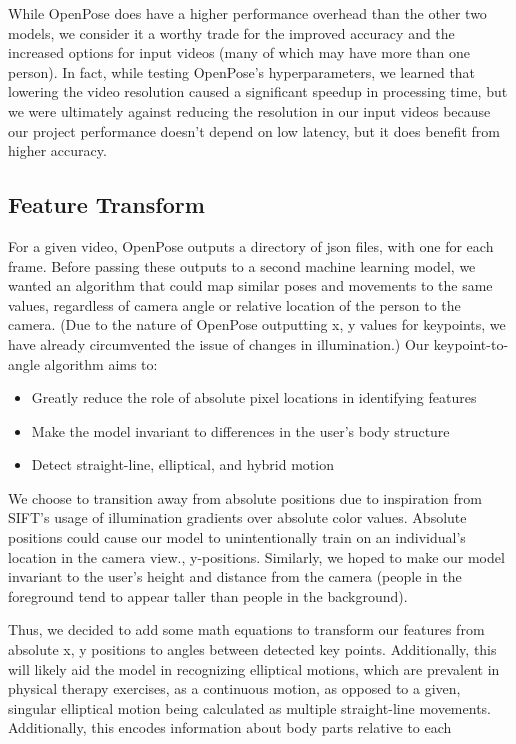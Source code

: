 While OpenPose does have a higher performance overhead than the other two models, we consider it a worthy trade for the 
improved accuracy and the increased options for input videos (many of which may have more than one person). In fact, while 
testing OpenPose’s hyperparameters, we learned that lowering the video resolution caused a significant speedup in 
processing time, but we were ultimately against reducing the resolution in our input videos because our project 
performance doesn’t depend on low latency, but it does benefit from higher accuracy.

\subsection{Feature Transform}
For a given video, OpenPose outputs a directory of json files, with one for each frame. Before passing these outputs to a 
second machine learning model, we wanted an algorithm that could map similar poses and movements to the same values, 
regardless of camera angle or relative location of the person to the camera. (Due to the nature of OpenPose outputting x, 
y values for keypoints, we have already circumvented the issue of changes in illumination.)  Our keypoint-to-angle algorithm 
aims to:
\begin{itemize}
    \item Greatly reduce the role of absolute pixel locations in identifying features
    \item Make the model invariant to differences in the user’s body structure
    \item Detect straight-line, elliptical, and hybrid motion
\end{itemize}

We choose to transition away from absolute positions due to inspiration from SIFT’s usage of illumination gradients over 
absolute color values. Absolute positions could cause our model to unintentionally train on an individual's location in the 
camera view., y-positions. Similarly, we hoped to make our model invariant to the user’s height and distance from the camera 
(people in the foreground tend to appear taller than people in the background). 

Thus, we decided to add some math equations to transform our features from absolute x, y positions to angles between detected 
key points. Additionally, this will likely aid the model in recognizing elliptical motions, which are prevalent in physical 
therapy exercises, as a continuous motion, as opposed to a given, singular elliptical motion being calculated as multiple 
straight-line movements. Additionally, this encodes information about body parts relative to each 
